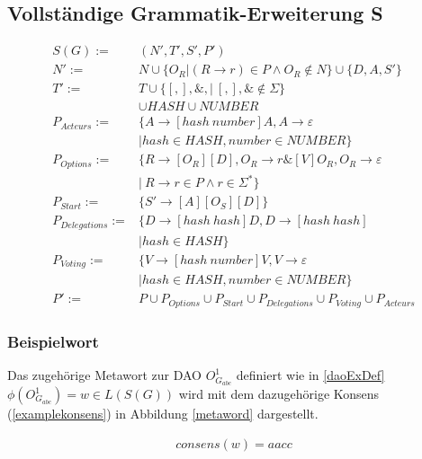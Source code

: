 \documentclass[a4paper,12pt]{report}
\begin{document}
\subsection{Vollständige Grammatik-Erweiterung S}
% 

\begin{align}
  S(G) :=& (N', T', S', P') \\
  N' :=& N \cup \{ O_R | (R\rightarrow r)\in P\land O_R \notin N\}\cup\{D, A, S'\}\\
  T' :=& T \cup \{[ , ], \&, |\ [,],\& \notin \Sigma \} \nonumber\\
  &\cup HASH
  \cup NUMBER
  \\
  P_{Acteurs} :=& \{A\rightarrow[hash\ number]A,A\rightarrow \varepsilon \\
  &| hash\in HASH, number\in NUMBER\} \\
  P_{Options} :=& \{R \rightarrow [O_R][D], O_R \rightarrow r\& [V] O_R, O_R \rightarrow \varepsilon \ \nonumber\\
  &\vert\ R\rightarrow r\in P \land r\in \Sigma^*\} \\
  P_{Start} :=& \{S'\rightarrow [A][O_S][D]\} \\
  P_{Delegations} :=& \{D\rightarrow [hash\ hash]D,D\rightarrow [hash\ hash]\nonumber\\&| hash\in HASH\} \\
  P_{Voting} :=& \{V\rightarrow [hash\ number]V, V \rightarrow \varepsilon \nonumber \\&| hash\in HASH, number\in NUMBER\} \\
  P' :=& P
  \cup P_{Options} 
  \cup P_{Start} 
  \cup P_{Delegations} 
  \cup P_{Voting} 
  \cup P_{Acteurs}
\end{align}

\subsubsection*{Beispielwort}
Das zugehörige Metawort zur DAO $O_{G_{abc}}^1$ definiert wie in \ref{daoExDef} $\phi(O_{G_{abc}}^1) = w \in L(S(G))$ wird mit dem dazugehörige Konsens (\ref{examplekonsens}) in Abbildung \ref{metaword} dargestellt.

\begin{eqnarray}
consens(w) = aacc \label{examplekonsens}
\end{eqnarray}
\end{document}
